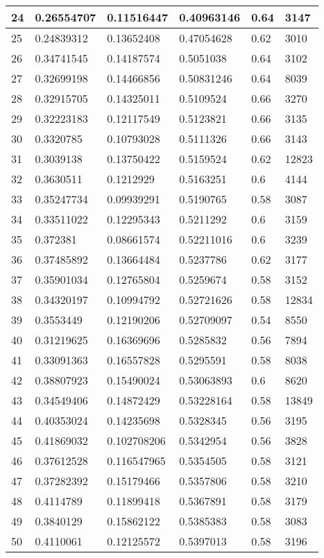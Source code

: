 \begin{longtable}{|l|l|l|l|l|l|}
24 & 0.26554707 & 0.11516447 & 0.40963146 & 0.64 & 3147 \\ \hline 
25 & 0.24839312 & 0.13652408 & 0.47054628 & 0.62 & 3010 \\ \hline 
26 & 0.34741545 & 0.14187574 & 0.5051038 & 0.64 & 3102 \\ \hline 
27 & 0.32699198 & 0.14466856 & 0.50831246 & 0.64 & 8039 \\ \hline 
28 & 0.32915705 & 0.14325011 & 0.5109524 & 0.66 & 3270 \\ \hline 
29 & 0.32223183 & 0.12117549 & 0.5123821 & 0.66 & 3135 \\ \hline 
30 & 0.3320785 & 0.10793028 & 0.5111326 & 0.66 & 3143 \\ \hline 
31 & 0.3039138 & 0.13750422 & 0.5159524 & 0.62 & 12823 \\ \hline 
32 & 0.3630511 & 0.1212929 & 0.5163251 & 0.6 & 4144 \\ \hline 
33 & 0.35247734 & 0.09939291 & 0.5190765 & 0.58 & 3087 \\ \hline 
34 & 0.33511022 & 0.12295343 & 0.5211292 & 0.6 & 3159 \\ \hline 
35 & 0.372381 & 0.08661574 & 0.52211016 & 0.6 & 3239 \\ \hline 
36 & 0.37485892 & 0.13664484 & 0.5237786 & 0.62 & 3177 \\ \hline 
37 & 0.35901034 & 0.12765804 & 0.5259674 & 0.58 & 3152 \\ \hline 
38 & 0.34320197 & 0.10994792 & 0.52721626 & 0.58 & 12834 \\ \hline 
39 & 0.3553449 & 0.12190206 & 0.52709097 & 0.54 & 8550 \\ \hline 
40 & 0.31219625 & 0.16369696 & 0.5285832 & 0.56 & 7894 \\ \hline 
41 & 0.33091363 & 0.16557828 & 0.5295591 & 0.58 & 8038 \\ \hline 
42 & 0.38807923 & 0.15490024 & 0.53063893 & 0.6 & 8620 \\ \hline 
43 & 0.34549406 & 0.14872429 & 0.53228164 & 0.58 & 13849 \\ \hline 
44 & 0.40353024 & 0.14235698 & 0.5328345 & 0.56 & 3195 \\ \hline 
45 & 0.41869032 & 0.102708206 & 0.5342954 & 0.56 & 3828 \\ \hline 
46 & 0.37612528 & 0.116547965 & 0.5354505 & 0.58 & 3121 \\ \hline 
47 & 0.37282392 & 0.15179466 & 0.5357806 & 0.58 & 3210 \\ \hline 
48 & 0.4114789 & 0.11899418 & 0.5367891 & 0.58 & 3179 \\ \hline 
49 & 0.3840129 & 0.15862122 & 0.5385383 & 0.58 & 3083 \\ \hline 
50 & 0.4110061 & 0.12125572 & 0.5397013 & 0.58 & 3196 \\ \hline 
\end{longtable}